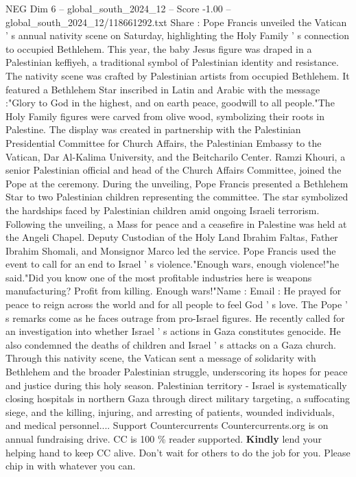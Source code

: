 \begin{textsample}{NEG Dim 6 – global\_south\_2024\_12 – Score -1.00 – global\_south\_2024\_12/118661292.txt}  \label{ex:f6_neg_026}
Share : Pope Francis unveiled the Vatican ' s annual nativity scene on Saturday, highlighting the Holy Family ' s connection to occupied Bethlehem.
This year, the baby Jesus figure was draped in a Palestinian keffiyeh, a traditional symbol of Palestinian identity and resistance.
The nativity scene was crafted by Palestinian artists from occupied Bethlehem.
It featured a Bethlehem Star inscribed in Latin and Arabic with the message :"Glory to God in the highest, and on earth peace, goodwill to all people."The Holy Family figures were carved from olive wood, symbolizing their roots in Palestine.
The display was created in partnership with the Palestinian Presidential Committee for Church Affairs, the Palestinian Embassy to the Vatican, Dar Al-Kalima University, and the Beitcharilo Center.
Ramzi Khouri, a senior Palestinian official and head of the Church Affairs Committee, joined the Pope at the ceremony.
During the unveiling, Pope Francis presented a Bethlehem Star to two Palestinian children representing the committee.
The star symbolized the hardships faced by Palestinian children amid ongoing Israeli terrorism.
Following the unveiling, a Mass for peace and a ceasefire in Palestine was held at the Angeli Chapel.
Deputy Custodian of the Holy Land Ibrahim Faltas, Father Ibrahim Shomali, and Monsignor Marco led the service.
Pope Francis used the event to call for an end to Israel ' s violence."Enough wars, enough violence!"he said."Did you know one of the most profitable industries here is weapons manufacturing?
Profit from killing.
Enough wars!"Name : Email : He prayed for peace to reign across the world and for all people to feel God ' s love.
The Pope ' s remarks come as he faces outrage from pro-Israel figures.
He recently called for an investigation into whether Israel ' s actions in Gaza constitutes genocide.
He also condemned the deaths of children and Israel ' s attacks on a Gaza church.
Through this nativity scene, the Vatican sent a message of solidarity with Bethlehem and the broader Palestinian struggle, underscoring its hopes for peace and justice during this holy season.
Palestinian territory - Israel is systematically closing hospitals in northern Gaza through direct military targeting, a suffocating siege, and the killing, injuring, and arresting of patients, wounded individuals, and medical personnel....
Support Countercurrents Countercurrents.org is on annual fundraising drive.
CC is 100 \% reader supported. \textbf{Kindly} lend your helping hand to keep CC alive.
Don't wait for others to do the job for you.
Please chip in with whatever you can.

\end{textsample}
